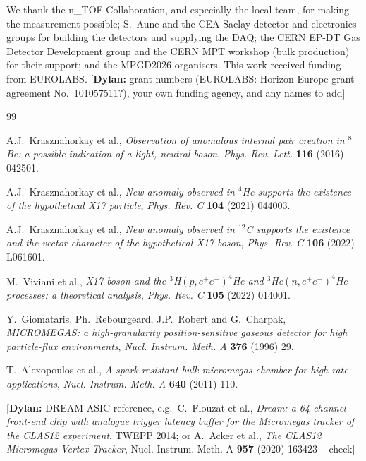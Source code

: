 \documentclass[a4paper,11pt]{article}
\newcommand{\askDylan}[1]{\textcolor{cyan!60!black}{[\textbf{Dylan:} #1]}}
\begin{document}
\acknowledgments

We thank the n\_TOF Collaboration, and especially the local team, for making the measurement
possible; S.~Aune and the CEA Saclay detector and electronics groups for building the detectors and
supplying the DAQ; the CERN EP-DT Gas Detector Development group and the CERN MPT workshop (bulk
production) for their support; and the MPGD2026 organisers. This work received funding from
EUROLABS. \askDylan{grant numbers (EUROLABS: Horizon Europe grant agreement No.~101057511?),
your own funding agency, and any names to add}

\begin{thebibliography}{99}

A.J.~Krasznahorkay et al., \emph{Observation of anomalous internal pair creation in $^8$Be: a
possible indication of a light, neutral boson}, \emph{Phys. Rev. Lett.} \textbf{116} (2016) 042501.

A.J.~Krasznahorkay et al., \emph{New anomaly observed in $^4$He supports the existence of the
hypothetical X17 particle}, \emph{Phys. Rev. C} \textbf{104} (2021) 044003.

A.J.~Krasznahorkay et al., \emph{New anomaly observed in $^{12}$C supports the existence and the
vector character of the hypothetical X17 boson}, \emph{Phys. Rev. C} \textbf{106} (2022) L061601.

M.~Viviani et al., \emph{X17 boson and the $^3$H$(p,e^+e^-)^4$He and $^3$He$(n,e^+e^-)^4$He
processes: a theoretical analysis}, \emph{Phys. Rev. C} \textbf{105} (2022) 014001.

Y.~Giomataris, Ph.~Rebourgeard, J.P.~Robert and G.~Charpak, \emph{MICROMEGAS: a high-granularity
position-sensitive gaseous detector for high particle-flux environments}, \emph{Nucl. Instrum.
Meth. A} \textbf{376} (1996) 29.

T.~Alexopoulos et al., \emph{A spark-resistant bulk-micromegas chamber for high-rate applications},
\emph{Nucl. Instrum. Meth. A} \textbf{640} (2011) 110.

\askDylan{DREAM ASIC reference, e.g.\ C.~Flouzat et al., \emph{Dream: a 64-channel front-end chip
with analogue trigger latency buffer for the Micromegas tracker of the CLAS12 experiment}, TWEPP
2014; or A.~Acker et al., \emph{The CLAS12 Micromegas Vertex Tracker}, Nucl. Instrum. Meth. A
\textbf{957} (2020) 163423 -- check}


\end{thebibliography}
\end{document}
